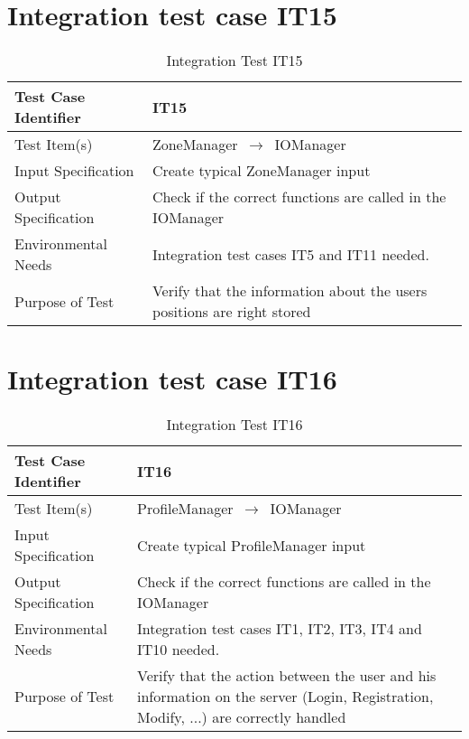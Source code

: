\documentclass[../../testPlan.tex]{subfiles}
\begin{document}
	\section{Integration test case IT15}
		\begin{table}[H]
			\centering
			\label{IT15}
			\begin{tabular}{ll}
				\hline
				Test Case Identifier & IT15 \\ \hline
				Test Item(s)         & ZoneManager $\,\to\,$ IOManager\\ \hline
				Input Specification  & Create typical ZoneManager input  \\ \hline
				Output Specification & Check if the correct functions are called in the IOManager\\ \hline
				Environmental Needs  &  Integration test cases IT5 and IT11 needed. \\ \hline
				Purpose of Test      &  Verify that the information about the users positions are right stored  \\ \hline
			\end{tabular}
			\caption{Integration Test IT15}
		\end{table}
	
	
	
	\section{Integration test case IT16}
		\begin{table}[H]
			\centering
			\label{IT16}
			\begin{tabular}{ll}
				\hline
				Test Case Identifier & IT16 \\ \hline
				Test Item(s)         & ProfileManager $\,\to\,$ IOManager\\ \hline
				Input Specification  & Create typical ProfileManager input  \\ \hline
				Output Specification & Check if the correct functions are called in the IOManager\\ \hline
				Environmental Needs  &  Integration test cases IT1, IT2, IT3, IT4 and IT10 needed. \\ \hline
				Purpose of Test      &  Verify that the action between the user and his information on the server (Login, Registration, Modify, ...) are correctly handled  \\ \hline
			\end{tabular}
			\caption{Integration Test IT16}
		\end{table}
		
\end{document}
